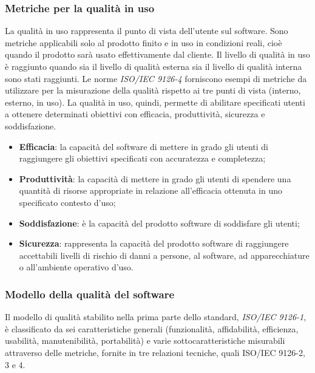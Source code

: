 \subsubsection{Metriche per la qualità in uso}
La qualità in uso rappresenta il punto di vista dell'utente sul software. Sono metriche applicabili solo al prodotto finito e in uso in condizioni reali, cioè quando il prodotto sarà usato effettivamente dal cliente.
Il livello di qualità in uso è raggiunto quando sia il livello di qualità esterna sia il livello di qualità interna sono stati raggiunti. Le norme \textit{ISO/IEC 9126-4} forniscono esempi di metriche da utilizzare per la misurazione della qualità rispetto ai tre punti di vista (interno, esterno, in uso). La qualità in uso, quindi, permette di abilitare specificati utenti a ottenere determinati obiettivi con efficacia, produttività, sicurezza e soddisfazione.

\begin{itemize}
\item \textbf{Efficacia}: la capacità del software di mettere in grado gli utenti di raggiungere gli obiettivi specificati con accuratezza e completezza;
\item \textbf{Produttività}: la capacità di mettere in grado gli utenti di spendere una quantità di risorse appropriate in relazione all'efficacia ottenuta in uno specificato contesto d'uso;
\item \textbf{Soddisfazione}: è la capacità del prodotto software di soddisfare gli utenti;
\item \textbf{Sicurezza}: rappresenta la capacità del prodotto software di raggiungere accettabili livelli di rischio di danni a persone, al software, ad apparecchiature o all'ambiente operativo d'uso.
\end{itemize}

\subsubsection{Modello della qualità del software}
Il modello di qualità stabilito nella prima parte dello standard, \textit{ISO/IEC 9126-1}, è classificato da sei caratteristiche generali (funzionalità, affidabilità, efficienza, usabilità, manutenibilità, portabilità) e varie sottocaratteristiche misurabili attraverso delle metriche, fornite in tre relazioni tecniche, quali ISO/IEC 9126-2, 3 e 4. 


